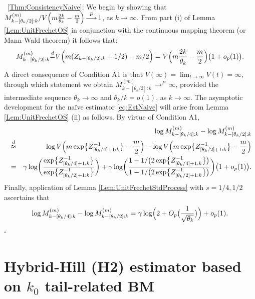 \documentclass[11pt, a4paper, oneside]{article}
\numberwithin{equation}{section}
\theoremstyle{plain}
\theoremstyle{definition}
\newenvironment{pfofThm}{\noindent{\bf Proof of Theorem}}{\hfill $\square$ \\}
\newcommand{\id}{\ensuremath{\displaystyle{\mathop {=} ^d}}}
\newcommand{\conv}[1]{\ensuremath{\, \displaystyle {\mathop{\longrightarrow}^{#1}}}\, }
\begin{document}
\begin{pfofThm}~\ref{Thm:ConsistencyNaive}:
We begin by showing that $M^{(m)}_{k - [\theta_k/2]:k}/ V\Bigl( m \frac{2k}{\theta_k} - \frac{m}{2} \Bigr) \conv{P} 1$, as $k \rightarrow \infty$. From part (i) of Lemma \eqref{Lem:UnitFrechetOS} in conjunction with the continuous mapping theorem (or Mann-Wald theorem) it follows that: 
\begin{equation*}
    M^{(m)}_{k - [\theta_k/2]:k} \id V\Bigl( m (Z_{k - [\theta_k/2]:k} + 1/2) - m/2 \Bigr)\\
                           = V\Bigl( m \frac{2k}{\theta_k} - \frac{m}{2} \Bigr) \bigl( 1+ o_p(1) \bigr).
\end{equation*}
A direct consequence of Condition A1 is that $V(\infty) = \lim_{t\rightarrow \infty} V(t)= \infty$, through which statement we obtain $M^{(m)}_{k - [\theta_k/2]:k} \conv{P} \infty$, provided the intermediate sequence $\theta_{k}\rightarrow \infty$ and $\theta_{k}/k=o(1)$, as $k \rightarrow \infty$. The asymptotic development for the na\"{i}ve estimator \eqref{eq:EstNaive} will arise from Lemma \ref{Lem:UnitFrechetOS} (ii) as follows. By virtue of Condition A1,
\begin{eqnarray*}
 & &   \log M^{(m)}_{k - [\theta_k/4]:k} - \log M^{(m)}_{k - [\theta_k/2]:k}\\
   &\stackrel{d}{\approx}& \,\log V \Bigl( m \exp\bigl\{Z^{-1}_{[\theta_k/4]+1:k} \bigr\} - \frac{m}{2}\Bigr) - \log V \Bigl( m \exp\bigl\{Z^{-1}_{[\theta_k/2]+1:k} \bigr\} - \frac{m}{2}\Bigr)\\
 &=& \gamma \log \biggl( \frac{\exp\bigl\{Z^{-1}_{[\theta_k/4]+1:k} \bigr\} }{\exp\bigl\{Z^{-1}_{[\theta_k/2]+1:k} \bigr\} }\biggr)+ \gamma \log \biggl( \frac{1- 1/\bigl( 2\exp\bigl\{Z^{-1}_{[\theta_k/4]+1:k} \bigr\} \bigr)}{1- 1/\bigl( 2\exp\bigl\{Z^{-1}_{[\theta_k/2]+1:k} \bigr\}\bigr)} \biggr)\bigl( 1+ o_p(1) \bigr).
\end{eqnarray*}
Finally, application of Lemma \ref{Lem:UnitFrechetStdProcess} with $s=1/4, 1/2$ ascertains that
\begin{equation*}
    \log M^{(m)}_{k - [\theta_k/4]:k} - \log M^{(m)}_{k - [\theta_k/2]:k} = \gamma \log \Bigl( 2  + O_p\bigl( \frac{1}{\sqrt{\theta_k}} \bigr) \Bigr) + o_p(1).
\end{equation*}
\end{pfofThm}


\section{Hybrid-Hill (H2) estimator based on $k_0$ tail-related BM}\label{Sec:HybridHill}
\end{document}
